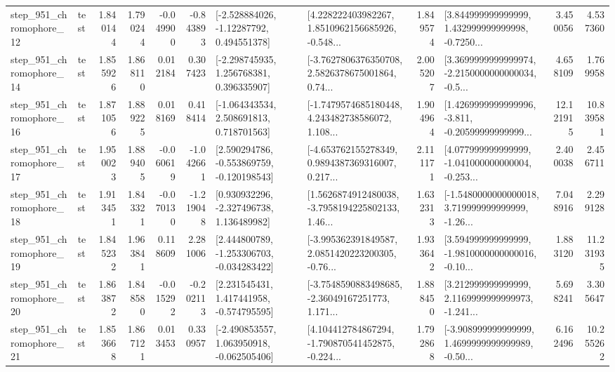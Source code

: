 \begin{tabular}{llrrrrllrlrr}
  step\_951\_chromophore\_12 &      test &      1.840144 &    1.790244 &     -0.049900 & -0.843893 &    [-2.528884026, -1.12287792, 0.494551378] &  [4.228222403982267, 1.8510962156685926, -0.548... &       1.849574 &  [3.844999999999999, 1.432999999999998, -0.7250... &            3.450056 &          4.537360 \\
  step\_951\_chromophore\_14 &      test &      1.855926 &    1.868110 &      0.012184 &  0.307423 &    [-2.298745935, 1.256768381, 0.396335907] &  [-3.7627806376350708, 2.5826378675001864, 0.74... &       2.005207 &  [3.3699999999999974, -2.2150000000000034, -0.5... &            4.658109 &          1.769958 \\
  step\_951\_chromophore\_16 &      test &      1.871056 &    1.889225 &      0.018169 &  0.418414 &    [-1.064343534, 2.508691813, 0.718701563] &  [-1.7479574685180448, 4.243482738586072, 1.108... &       1.904964 &  [1.4269999999999996, -3.811, -0.20599999999999... &           12.121915 &         10.839581 \\
  step\_951\_chromophore\_17 &      test &      1.950023 &    1.889405 &     -0.060619 & -1.042661 &   [2.590294786, -0.553869759, -0.120198543] &  [-4.653762155278349, 0.9894387369316007, 0.217... &       2.111171 &  [4.077999999999999, -1.041000000000004, -0.253... &            2.400038 &          2.456711 \\
  step\_951\_chromophore\_18 &      test &      1.913451 &    1.843321 &     -0.070130 & -1.219048 &    [0.930932296, -2.327496738, 1.136489982] &  [1.5626874912480038, -3.7958194225802133, 1.46... &       1.632313 &  [-1.5480000000000018, 3.719999999999999, -1.26... &            7.048916 &          2.299128 \\
  step\_951\_chromophore\_19 &      test &      1.845232 &    1.963841 &      0.118609 &  2.281006 &   [2.444800789, -1.253306703, -0.034283422] &  [-3.995362391849587, 2.0851420223200305, -0.76... &       1.933642 &  [3.594999999999999, -1.9810000000000016, -0.10... &            1.883120 &         11.231935 \\
  step\_951\_chromophore\_20 &      test &      1.863872 &    1.848580 &     -0.015292 & -0.202113 &    [2.231545431, 1.417441958, -0.574795595] &  [-3.7548590883498685, -2.36049167251773, 1.171... &       1.888450 &  [3.212999999999999, 2.1169999999999973, -1.241... &            5.698241 &          3.305647 \\
  step\_951\_chromophore\_21 &      test &      1.853668 &    1.867121 &      0.013453 &  0.330957 &   [-2.490853557, 1.063950918, -0.062505406] &  [4.104412784867294, -1.790870541452875, -0.224... &       1.792868 &  [-3.908999999999999, 1.4699999999999989, -0.50... &            6.162496 &         10.255262 \\

\end{tabular}
